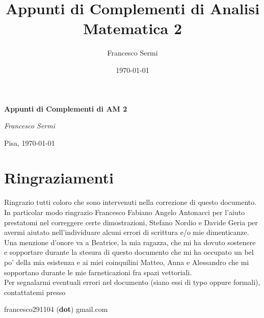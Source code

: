 \documentclass[openany, italian]{book}
\title{Appunti di Complementi di Analisi Matematica 2}
\author{Francesco Sermi}
\date{\today}
\begin{document}
	\begin{titlepage}
	\centering
	\vspace*{3cm}
	{\huge\bfseries Appunti di Complementi di AM 2 \par}
	\vspace{2cm}
	{\Large\itshape Francesco Sermi\par}
	\vfill
	\vfill	
	{\large \hfill Pisa, \today \par}
	\end{titlepage}
	\chapter*{Ringraziamenti}
	Ringrazio tutti coloro che sono intervenuti nella correzione di questo documento. In particolar modo ringrazio Francesco Fabiano Angelo Antonacci per l'aiuto prestatomi nel correggere certe dimostrazioni, Stefano Nordio e Davide Geria per avermi aiutato nell'individuare alcuni errori di scrittura e/o mie dimenticanze. \\
	Una menzione d'onore va a Beatrice, la mia ragazza, che mi ha dovuto sostenere e sopportare durante la stesura di questo documento che mi ha occupato un bel po' della mia esistenza e ai miei coinquilini Matteo, Anna e Alessandro che mi sopportano durante le mie farneticazioni fra spazi vettoriali. \\
	Per segnalarmi eventuali errori nel documento (siano essi di typo oppure formali), contattatemi presso
	\begin{center}
		francesco291104 (\textbf{dot}) gmail.com
	\end{center}
	
\end{document}
